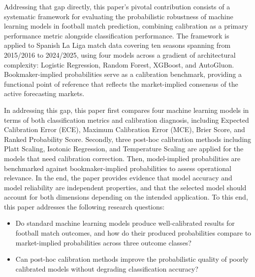 \documentclass[conference]{IEEEtran}
\begin{document}
Addressing that gap directly, this paper's pivotal contribution
consists of a systematic framework for evaluating the
probabilistic robustness of machine learning models in football
match prediction, combining calibration as a primary performance
metric alongside classification performance. The framework is
applied to Spanish La Liga match data covering ten seasons
spanning from 2015/2016 to 2024/2025, using four models across
a gradient of architectural complexity: Logistic Regression,
Random Forest, XGBoost, and AutoGluon. Bookmaker-implied
probabilities serve as a calibration benchmark, providing a
functional point of reference that reflects the market-implied
consensus of the active forecasting markets.

In addressing this gap, this paper first compares four machine
learning models in terms of both classification metrics and
calibration diagnosis, including Expected Calibration Error
(ECE), Maximum Calibration Error (MCE), Brier Score, and Ranked
Probability Score. Secondly, three post-hoc calibration methods
including Platt Scaling, Isotonic Regression, and Temperature
Scaling are applied for the models that need calibration
correction. Then, model-implied probabilities are benchmarked
against bookmaker-implied probabilities to assess operational
relevance. In the end, the paper provides evidence that model
accuracy and model reliability are independent properties, and
that the selected model should account for both dimensions
depending on the intended application.
To this end, this paper addresses the following
research questions:
\begin{itemize}
    \item \textbf{} Do standard machine learning
    models produce well-calibrated results for football
    match outcomes, and how do their produced
    probabilities compare to market-implied probabilities
    across three outcome classes?
    \item \textbf{} Can post-hoc calibration methods
    improve the probabilistic quality of poorly
    calibrated models without degrading classification
    accuracy?
\end{itemize}
\end{document}
